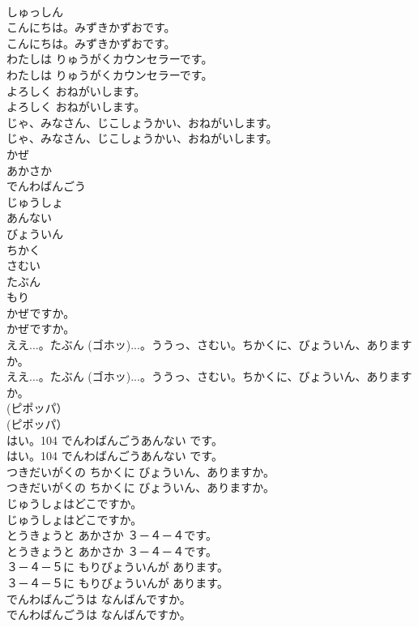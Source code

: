 \documentclass[8pt]{extreport}
\begin{document}
\begin{CJK}{UTF8}{min}
\\	しゅっしん
\\	こんにちは。みずきかずおです。	
\\	こんにちは。みずきかずおです。 
\\	わたしは りゅうがくカウンセラーです。	
\\	わたしは りゅうがくカウンセラーです。 
\\	よろしく おねがいします。	
\\	よろしく おねがいします。 
\\	じゃ、みなさん、じこしょうかい、おねがいします。	
\\	じゃ、みなさん、じこしょうかい、おねがいします。 
\\	かぜ
\\	あかさか
\\	でんわばんごう
\\	じゅうしょ
\\	あんない
\\	びょういん
\\	ちかく
\\	さむい
\\	たぶん
\\	もり
\\	かぜですか。	
\\	かぜですか。 
\\	ええ...。たぶん (ゴホッ)...。ううっ、さむい。ちかくに、びょういん、ありますか。	
\\	ええ...。たぶん (ゴホッ)...。ううっ、さむい。ちかくに、びょういん、ありますか。 
\\	(ピポッパ）	
\\	(ピポッパ） 
\\	はい。104 でんわばんごうあんない です。	
\\	はい。104 でんわばんごうあんない です。 
\\	つきだいがくの ちかくに びょういん、ありますか。	
\\	つきだいがくの ちかくに びょういん、ありますか。 
\\	じゅうしょはどこですか。	
\\	じゅうしょはどこですか。 
\\	とうきょうと あかさか ３－４－４です。	
\\	とうきょうと あかさか ３－４－４です。 
\\	３－４－５に もりびょういんが あります。	
\\	３－４－５に もりびょういんが あります。 
\\	でんわばんごうは なんばんですか。	
\\	でんわばんごうは なんばんですか。 

\end{CJK}
\end{document}
